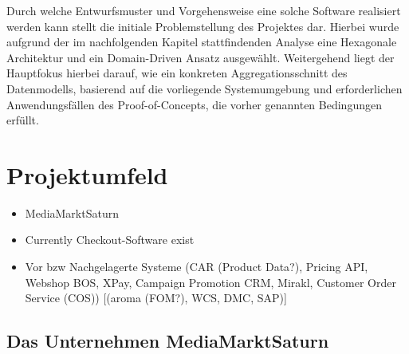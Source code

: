 Durch welche Entwurfsmuster und Vorgehensweise eine solche Software realisiert werden kann stellt die initiale Problemstellung des Projektes dar. Hierbei wurde aufgrund der im nachfolgenden Kapitel stattfindenden Analyse eine Hexagonale Architektur und ein Domain-Driven Ansatz ausgewählt. Weitergehend liegt der Hauptfokus hierbei darauf, wie ein konkreten Aggregationsschnitt des Datenmodells, basierend auf die vorliegende Systemumgebung und erforderlichen Anwendungsfällen des Proof-of-Concepts, die vorher genannten Bedingungen erfüllt.







\section{Projektumfeld}
\begin{itemize}[noitemsep,nolistsep]
	\item MediaMarktSaturn
	\item Currently Checkout-Software exist
	\item Vor bzw Nachgelagerte Systeme (CAR (Product Data?), Pricing API, Webshop BOS, XPay, Campaign Promotion CRM, Mirakl,  Customer Order Service (COS)) [(aroma (FOM?), WCS, DMC, SAP)] %
\end{itemize}

\subsection{Das Unternehmen MediaMarktSaturn}

